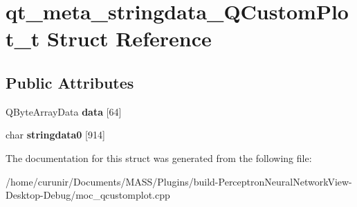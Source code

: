\hypertarget{structqt__meta__stringdata___q_custom_plot__t}{}\section{qt\+\_\+meta\+\_\+stringdata\+\_\+\+Q\+Custom\+Plot\+\_\+t Struct Reference}
\label{structqt__meta__stringdata___q_custom_plot__t}
\subsection*{Public Attributes}
\begin{DoxyCompactItemize}
\item 
Q\+Byte\+Array\+Data {\bfseries data} \mbox{[}64\mbox{]}\hypertarget{structqt__meta__stringdata___q_custom_plot__t_a8977178dafbbe5777e63d644f3bf262a}{}\label{structqt__meta__stringdata___q_custom_plot__t_a8977178dafbbe5777e63d644f3bf262a}

\item 
char {\bfseries stringdata0} \mbox{[}914\mbox{]}\hypertarget{structqt__meta__stringdata___q_custom_plot__t_ad63fb62139acbe99179838dc5bd42bbb}{}\label{structqt__meta__stringdata___q_custom_plot__t_ad63fb62139acbe99179838dc5bd42bbb}

\end{DoxyCompactItemize}


The documentation for this struct was generated from the following file\+:\begin{DoxyCompactItemize}
\item 
/home/curunir/\+Documents/\+M\+A\+S\+S/\+Plugins/build-\/\+Perceptron\+Neural\+Network\+View-\/\+Desktop-\/\+Debug/moc\+\_\+qcustomplot.\+cpp\end{DoxyCompactItemize}
